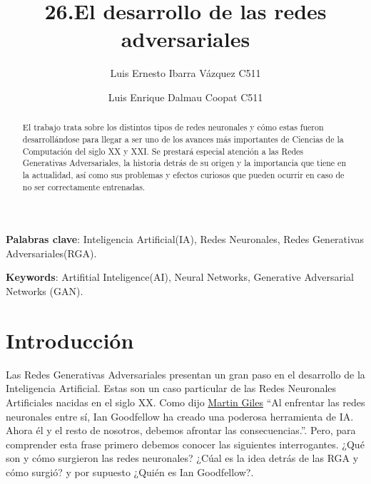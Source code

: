 \documentclass[a4paper]{article}
\begin{document}
\title{26.El desarrollo de las redes adversariales}
\author{Luis Ernesto Ibarra Vázquez C511\and
Luis Enrique Dalmau Coopat C511}
%
%

\maketitle

\begin{abstract}

El trabajo trata sobre los distintos tipos de redes neuronales y cómo estas fueron desarrollándose
para llegar a ser uno de los avances más importantes de Ciencias de la Computación del siglo XX y XXI.
Se prestará especial atención a las Redes Generativas Adversariales, la historia detrás de su origen y
la importancia que tiene en la actualidad, así como sus problemas y efectos curiosos que pueden ocurrir
en caso de no ser correctamente entrenadas. 

\end{abstract}

\textbf{Palabras clave}: Inteligencia Artificial(IA), Redes Neuronales, Redes Generativas Adversariales(RGA).

\textbf{Keywords}: Artifitial Inteligence(AI), Neural Networks, Generative Adversarial Networks (GAN).

\section{Introducción}

Las Redes Generativas Adversariales presentan un gran paso en el desarrollo de la Inteligencia
Artificial. Estas son un caso particular de las Redes Neuronales Artificiales nacidas en el siglo XX.
Como dijo \href{https://www.technologyreview.com/author/martin-giles/}{Martin Giles} 
``Al enfrentar las redes neuronales entre sí, Ian Goodfellow ha creado una poderosa herramienta 
de IA. Ahora él y el resto de nosotros, debemos afrontar las consecuencias.''. Pero, para comprender 
esta frase primero debemos conocer las siguientes interrogantes. ¿Qué son y cómo surgieron las redes neuronales? 
¿Cúal es la idea detrás de las RGA y cómo surgió? y por supuesto ¿Quién es Ian Goodfellow?.
\end{document}
